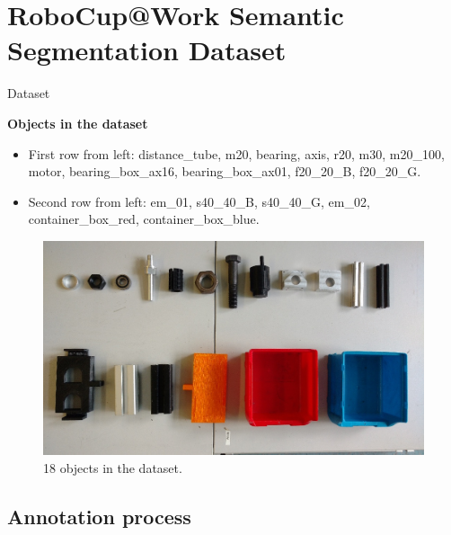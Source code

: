 \documentclass{beamer}
\begin{document}
\section{RoboCup@Work Semantic Segmentation Dataset}

\begin{frame}{Dataset}
	
	\textbf{Objects in the dataset}
	\begin{small}
		\begin{itemize}
			\item First row from left: distance\_tube, m20, bearing, axis, r20, m30, m20\_100, motor, bearing\_box\_ax16, bearing\_box\_ax01, f20\_20\_B, f20\_20\_G. 
			\item Second row from left: em\_01, s40\_40\_B, s40\_40\_G, em\_02, container\_box\_red, container\_box\_blue.
		\end{itemize}
	\end{small}
	\begin{figure}[h]
		\centering
		\includegraphics[scale=0.2]{images/all_objects}
		\captionsetup{justification=centering,margin=0.2cm}
		\caption{18 objects in the dataset.}
		\label{Fig:allobjects}
	\end{figure}

\end{frame}

\subsection{Annotation process}
\end{document}
